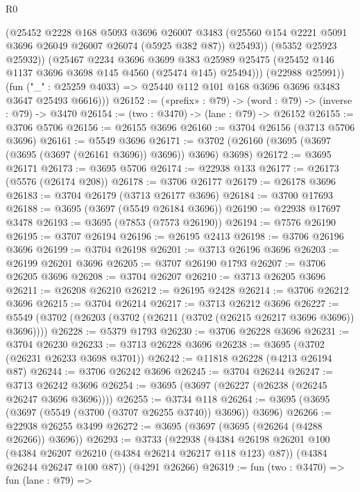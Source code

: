 \begin{lexlean}{R0}
\begin{coremodule}
                (@25452
                  @2228
                  @168
                  @5093
                  @3696
                  @26007
                  @3483
                  (@25560 @154 @2221 @5091 @3696 @26049 @26007 @26074 (@5925 @382 @87))
                  @25493))
              (@5352 @25923 @25932))
            (@25467
              @2234
              @3696
              @3699
              @383
              @25989
              @25475
              (@25452 @146 @1137 @3696 @3698 @145 @4560 (@25474 @145) @25494)))
          (@22988 @25991))
        (fun ("_" : @25259 @4033) => @25440 @112 @101 @168 @3696 @3696 @3483 @3647 @25493 @6616)))
@26152 := («prefix» : @79) -> (word : @79) -> (inverse : @79) -> @3470
@26154 := (two : @3470) -> (lane : @79) -> @26152
@26155 := @3706 @5706
@26156 := @26155 @3696
@26160 := @3704 @26156 (@3713 @5706 @3696)
@26161 := @5549 @3696
@26171 := @3702 (@26160 (@3695 (@3697 (@3695 (@3697 (@26161 @3696)) @3696)) @3696) @3698)
@26172 := @3695 @26171
@26173 := @3695 @5706
@26174 := @22938 @133
@26177 := @26173 (@5576 (@26174 @208))
@26178 := @3706 @26177
@26179 := @26178 @3696
@26183 := @3704 @26179 (@3713 @26177 @3696)
@26184 := @3700 @17693
@26188 := @3695 (@3697 (@5549 @26184 @3696))
@26190 := @22938 @17697 @3478
@26193 := @3695 (@7853 (@7573 @26190))
@26194 := @7576 @26190
@26195 := @3707 @26194
@26196 := @26195 @2413
@26198 := @3706 @26196 @3696
@26199 := @3704 @26198
@26201 := @3713 @26196 @3696
@26203 := @26199 @26201 @3696
@26205 := @3707 @26190 @1793
@26207 := @3706 @26205 @3696
@26208 := @3704 @26207
@26210 := @3713 @26205 @3696
@26211 := @26208 @26210
@26212 := @26195 @2428
@26214 := @3706 @26212 @3696
@26215 := @3704 @26214
@26217 := @3713 @26212 @3696
@26227 := @5549 (@3702 (@26203 (@3702 (@26211 (@3702 (@26215 @26217 @3696 @3696)) @3696))))
@26228 := @5379 @1793
@26230 := @3706 @26228 @3696
@26231 := @3704 @26230
@26233 := @3713 @26228 @3696
@26238 := @3695 (@3702 (@26231 @26233 @3698 @3701))
@26242 := @11818 @26228 (@4213 @26194 @87)
@26244 := @3706 @26242 @3696
@26245 := @3704 @26244
@26247 := @3713 @26242 @3696
@26254 := @3695 (@3697 (@26227 (@26238 (@26245 @26247 @3696 @3696))))
@26255 := @3734 @118
@26264 := @3695 (@3695 (@3697 (@5549 (@3700 (@3707 @26255 @3740)) @3696)) @3696)
@26266 := @22938 @26255 @3499
@26272 := @3695 (@3697 (@3695 (@26264 (@4288 @26266)) @3696))
@26293 := @3733
    (@22938
      (@4384 @26198 @26201 @100 (@4384 @26207 @26210 (@4384 @26214 @26217 @118 @123) @87))
      (@4384 @26244 @26247 @100 @87))
    (@4291 @26266)
@26319 := fun (two : @3470) =>
  fun (lane : @79) =>

\end{coremodule}
\end{lexlean}
